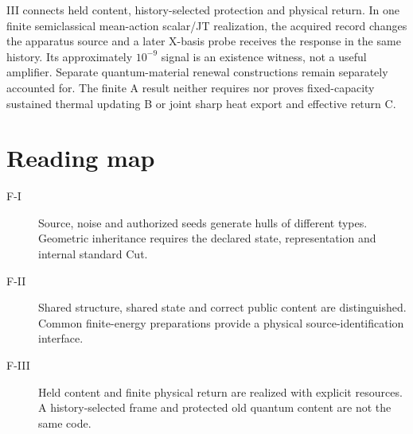 \documentclass[11pt,a4paper]{article}
\begin{document}
III connects held content, history-selected protection and physical return. In one finite semiclassical mean-action scalar/JT realization, the acquired record changes the apparatus source and a later X-basis probe receives the response in the same history. Its approximately $10^{-9}$ signal is an existence witness, not a useful amplifier. Separate quantum-material renewal constructions remain separately accounted for. The finite A result neither requires nor proves fixed-capacity sustained thermal updating B or joint sharp heat export and effective return C.

\section*{Reading map}
\begin{description}
\item[F-I] Source, noise and authorized seeds generate hulls of different types. Geometric inheritance requires the declared state, representation and internal standard Cut.
\item[F-II] Shared structure, shared state and correct public content are distinguished. Common finite-energy preparations provide a physical source-identification interface.
\item[F-III] Held content and finite physical return are realized with explicit resources. A history-selected frame and protected old quantum content are not the same code.
\end{description}
\end{document}
